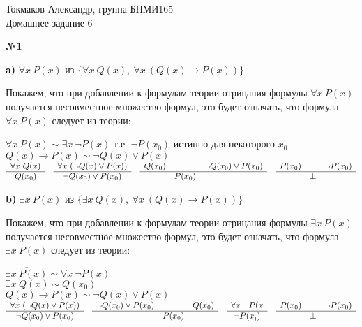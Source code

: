 \documentclass{article}
\newenvironment{task}{\begin{center}\fontsize{14}{14}\selectfont\bf}{\rm\fontsize{12}{12}\selectfont\end{center}}
\newcommand{\res}[3]{\begin{array}{lcr} #1 & & #2 \\ \hline & #3 \end{array}}
\newcommand{\resq}[2]{\begin{array}{c} #1 \\ \hline #2 \end{array}}
\begin{document}
	\begin{center}
		Токмаков Александр, группа БПМИ165 \\
		Домашнее задание 6
	\end{center}

	
	\begin{task} 
		№1
	\end{task}
	\begin{center}
	\textbf{a)} $\forall x \ P(x)$ из $\lbrace \forall x\ Q(x), \ \forall x\ (Q(x) \rightarrow P(x))\rbrace$  
	\end{center}
	Покажем, что при добавлении к формулам теории отрицания формулы $\forall x \ P(x)$ получается несовместное множество формул, это будет означать, что формула $\forall x \ P(x)$ следует из теории:
	\begin{center}
		$\overline{\forall x \ P(x)} \sim \exists x\ \neg P(x)$ т.е. $\neg P(x_0)$ истинно для некоторого $x_0$\\
		$Q(x) \rightarrow P(x) \sim \neg Q(x) \vee P(x)$\\\vspace{3px}
		$\resq{\forall x\ Q(x)}{Q(x_0)} \quad \resq{\forall x\ (\neg Q(x) \vee P(x))}{\neg Q(x_0) \vee P(x_0)} \quad \res{Q(x_0)}{\neg Q(x_0) \vee P(x_0)}{P(x_0)} \quad \res{P(x_0)}{\neg P(x_0)}{\bot}$  
	\end{center}

	\begin{center}
	\textbf{b)} $\exists x \ P(x)$ из $\lbrace \exists x\ Q(x), \ \forall x\ (Q(x) \rightarrow P(x))\rbrace$  
	\end{center}
	Покажем, что при добавлении к формулам теории отрицания формулы $\exists x \ P(x)$ получается несовместное множество формул, это будет означать, что формула $\exists x \ P(x)$ следует из теории:
	\begin{center}
	$\overline{\exists x \ P(x)} \sim \forall x\ \neg P(x)$\\
	$\exists x\ Q(x) \sim Q(x_0)$\\
	$Q(x) \rightarrow P(x) \sim \neg Q(x) \vee P(x)$\\\vspace{3px}
	$\resq{ \forall x\ (\neg Q(x) \vee P(x))}{\neg Q(x_0) \vee P(x_0)} \quad
	\res{\neg Q(x_0) \vee P(x_0)}{Q(x_0)}{P(x_0)} \quad
	\resq{\forall x\ \neg P(x}{ \neg P(x_))} \quad
	\res{P(x_0)}{\neg P(x_0)}{\bot}$  
	\end{center}
\end{document}
